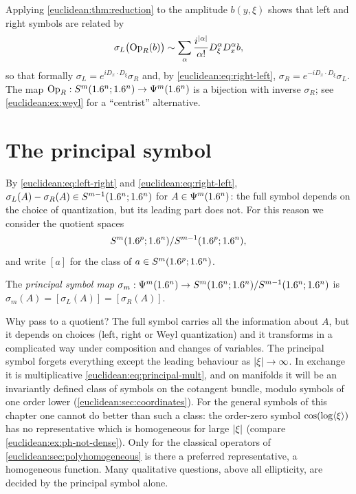 Applying \cref{euclidean:thm:reduction} to the amplitude $b(y,\xi)$ shows
that left and right symbols are related by
\begin{equation}\label{euclidean:eq:left-right}
  \sigma_L\bigl(\operatorname{Op}_R(b)\bigr)\sim\sum_\alpha\frac{i^{\lvert \alpha\rvert}}{\alpha!}
  D^\alpha_\xi D^\alpha_xb,
\end{equation}
so that formally $\sigma_L=e^{iD_x\cdot D_\xi}\sigma_R$ and, by
\eqref{euclidean:eq:right-left}, $\sigma_R=e^{-iD_x\cdot D_\xi}\sigma_L$.
The map $\operatorname{Op}_R:S^m(1.6^n;1.6^n)\to\Psi^{m}(1.6^n)$ is a bijection with inverse
$\sigma_R$; see \cref{euclidean:ex:weyl} for a ``centrist'' alternative.

\section{The principal symbol}\label{euclidean:sec:principal}

By \eqref{euclidean:eq:left-right} and \eqref{euclidean:eq:right-left},
$\sigma_L(A)-\sigma_R(A)\in S^{m-1}(1.6^n;1.6^n)$ for $A\in\Psi^{m}(1.6^n)$: the
full symbol depends on the choice of quantization, but its leading part does
not. For this reason we consider the quotient spaces
\begin{equation*}
  S^{m}(1.6^p;1.6^n)/S^{m-1}(1.6^p;1.6^n),
\end{equation*}
and write $[a]$ for the class of $a\in S^m(1.6^p;1.6^n)$.

\begin{definition}\label{euclidean:def:principal-symbol}
  The \emph{principal symbol map}
  $\sigma_m:\Psi^{m}(1.6^n)\to S^m(1.6^n;1.6^n)/S^{m-1}(1.6^n;1.6^n)$ is
  $\sigma_m(A)=[\sigma_L(A)]=[\sigma_R(A)]$.
\end{definition}

\begin{discussion}
Why pass to a quotient? The full symbol carries all the information about $A$, but it
depends on choices (left, right or Weyl quantization) and it transforms in a
complicated way under composition and changes of variables. The principal symbol
forgets everything except the leading behaviour as $\lvert \xi\rvert\to\infty$. In exchange it
is multiplicative \eqref{euclidean:eq:principal-mult}, and on manifolds it will be an
invariantly defined class of symbols on the cotangent bundle, modulo symbols of one
order lower (\cref{euclidean:sec:coordinates}). For the general symbols of this
chapter one cannot do better than such a class: the order-zero symbol
$\cos(\log\langle \xi\rangle)$ has no representative which is homogeneous for large $\lvert \xi\rvert$
(compare \cref{euclidean:ex:ph-not-dense}). Only for the classical operators of
\cref{euclidean:sec:polyhomogeneous} is there a preferred representative, a
homogeneous function.
Many qualitative questions, above all ellipticity, are decided by the principal symbol
alone.
\end{discussion}

